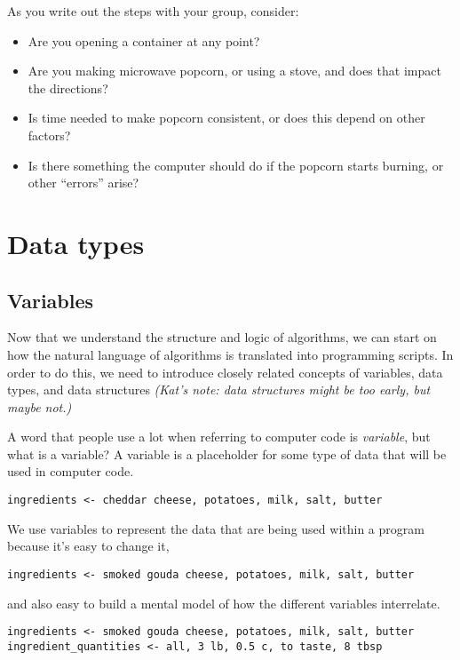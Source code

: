 \documentclass[
]{book}
\providecommand{\tightlist}{%
  \setlength{\itemsep}{0pt}\setlength{\parskip}{0pt}}
\begin{document}
As you write out the steps with your group, consider:

\begin{itemize}
\tightlist
\item
  Are you opening a container at any point?
\item
  Are you making microwave popcorn, or using a stove, and does that impact the directions?
\item
  Is time needed to make popcorn consistent, or does this depend on other factors?
\item
  Is there something the computer should do if the popcorn starts burning, or other ``errors'' arise?
\end{itemize}

\chapter{Data types}\label{data-types}

\section{Variables}\label{variables}

Now that we understand the structure and logic of algorithms, we can start on how the natural language of algorithms is translated into programming scripts. In order to do this, we need to introduce closely related concepts of variables, data types, and data structures \emph{(Kat's note: data structures might be too early, but maybe not.)}

A word that people use a lot when referring to computer code is \emph{variable}, but what is a variable? A variable is a placeholder for some type of data that will be used in computer code.

\texttt{ingredients\ \textless{}-\ cheddar\ cheese,\ potatoes,\ milk,\ salt,\ butter}

We use variables to represent the data that are being used within a program because it's easy to change it,

\texttt{ingredients\ \textless{}-\ smoked\ gouda\ cheese,\ potatoes,\ milk,\ salt,\ butter}

and also easy to build a mental model of how the different variables interrelate.

\begin{verbatim}
ingredients <- smoked gouda cheese, potatoes, milk, salt, butter
ingredient_quantities <- all, 3 lb, 0.5 c, to taste, 8 tbsp
\end{verbatim}
\end{document}

